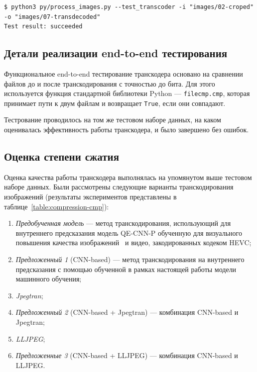 \documentclass[times,specification,annotation]{itmo-student-thesis}
\begin{document}
\begin{lstlisting}[float=!h,caption={Пример запуска end-to-end тестов транскодера},label={listing:end-to-end-tests}]
$ python3 py/process_images.py --test_transcoder -i "images/02-croped" -o "images/07-transdecoded"
Test result: succeeded
\end{lstlisting}

\subsection{Детали реализации end-to-end тестирования}\label{section:functional-testing}

Функциональное end-to-end тестирование транскодера основано на сравнении файлов до и после транскодирования с точностью до бита. Для этого используется функция стандартной библиотеки Python --- \texttt{filecmp.cmp}, которая принимает пути к двум файлам и возвращает \texttt{True}, если они совпадают.\par

Тестрование проводилось на том же тестовом наборе данных, на каком оценивалась эффективность работы транскодера, и было завершено без ошибок.

\subsection{Оценка степени сжатия}\label{subsectiong:compressing-testing}
Оценка качества работы транскодера выполнялась на упомянутом выше тестовом наборе данных. Были рассмотрены следующие варианты транскодирования изображений (результаты экспериментов представлены в таблице~\ref{table:compression-cmp}):
\begin{enumerate}
    \item \textit{Предобученная модель} --- метод транскодирования, использующий для внутреннего предсказания модель QE-CNN-P обученную для визуального повышения качества изображений~\cite{ai-video-enhancement} и видео, закодированных кодеком HEVC;
    \item \textit{Предложенный 1} (CNN-based) --- метод транскодирования на внутреннего предсказания с помощью обученной в рамках настоящей работы модели машинного обучения;
    \item \textit{Jpegtran};
    \item \textit{Предложенный 2} (CNN-based + Jpegtran) --- комбинация CNN-based и Jpegtran;
    \item \textit{LLJPEG};
    \item \textit{Предложенные 3} (CNN-based + LLJPEG) --- комбинация CNN-based и LLJPEG.
\end{enumerate}
\end{document}
